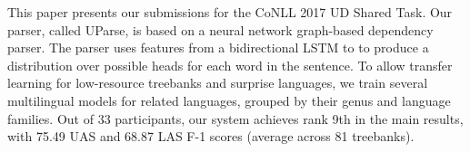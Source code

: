This paper presents our submissions for the CoNLL 2017 UD Shared Task. Our parser, called UParse, is based on a neural network graph-based dependency parser. The parser uses features from a bidirectional LSTM to to produce a distribution over possible heads for each word in the sentence. To allow transfer learning for low-resource treebanks and surprise languages, we train several multilingual models for related languages, grouped by their genus and language families. Out of 33 participants, our system achieves rank 9th in the main results, with 75.49 UAS and 68.87 LAS F-1 scores (average across 81 treebanks).
